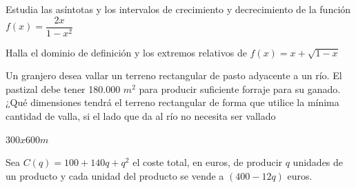 \documentclass[addpoints,spanish, 12pt,a4paper]{exam}
\begin{document}
\begin{questions}
\question[4] Estudia las asíntotas y los intervalos de crecimiento y decrecimiento de la función $f(x)=\dfrac{2x}{1-x^2}$

\question[3] Halla el dominio de definición y los extremos relativos de $f(x)=x+\sqrt{1-x}$

       
       

\question[4] Un granjero desea vallar un terreno rectangular de pasto adyacente a un río. El pastizal debe tener 180.000
$m^2$
para producir suficiente forraje para su ganado. ¿Qué dimensiones tendrá el terreno rectangular de
forma que utilice la mínima cantidad de valla, si el lado que da al río no necesita ser vallado
\begin{solution}
    $300 x 600 m$
\end{solution}

\question Sea $C(q) = 100 + 140 q + q^2$ el coste total, en euros, de producir $q$ unidades de un
producto y cada unidad del producto se vende a $(400 - 12 q)$ euros.
\end{questions}
\end{document}

